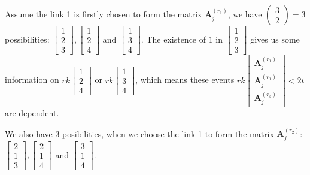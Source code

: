 Assume the link 1 is firstly chosen to form the matrix $\boldsymbol{A}_{j}^{\left(r_{1}\right)}$,
we have $\left(\begin{array}{c}
3\\
2
\end{array}\right)=3$ possibilities: $\left[\begin{array}{c}
1\\
2\\
3
\end{array}\right],\left[\begin{array}{c}
1\\
2\\
4
\end{array}\right]$ and $\left[\begin{array}{c}
1\\
3\\
4
\end{array}\right]$. The existence of $1$ in $\left[\begin{array}{c}
1\\
2\\
3
\end{array}\right]$ gives us some information on $rk\left[\begin{array}{c}
1\\
2\\
4
\end{array}\right]$ or $rk\left[\begin{array}{c}
1\\
3\\
4
\end{array}\right]$, which means these events $rk\left[\begin{array}{c}
\boldsymbol{A}_{j}^{\left(r_{1}\right)}\\
\boldsymbol{A}_{j}^{\left(r_{1}\right)}\\
\boldsymbol{A}_{j}^{\left(r_{3}\right)}
\end{array}\right]<2t$ are dependent. 

We also have 3 posibilities, when we choose the link 1 to form the
matrix $\boldsymbol{A}_{j}^{\left(r_{2}\right)}$: $\left[\begin{array}{c}
2\\
1\\
3
\end{array}\right],\left[\begin{array}{c}
2\\
1\\
4
\end{array}\right]$ and $\left[\begin{array}{c}
3\\
1\\
4
\end{array}\right]$. 

